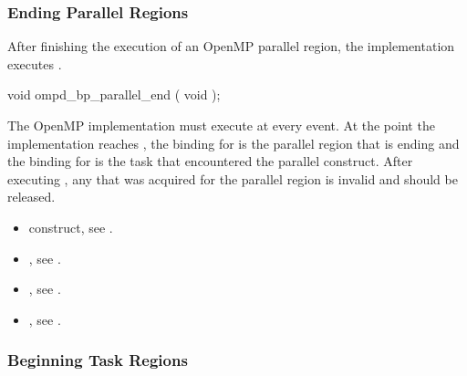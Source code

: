 \subsubsection{Ending Parallel Regions}
\label{subsubsec:ompd_bp_parallel_end}

\summary
After finishing the execution of an OpenMP parallel region, 
the implementation executes .

\format
\begin{cspecific}
\begin{ompSyntax}
void ompd_bp_parallel_end ( void );
\end{ompSyntax}
\end{cspecific}


\descr
The OpenMP implementation must execute  at 
every  event. At the point the implementation reaches 
, the binding for  
is the parallel region that is ending and the binding for 
 is the task that encountered the 
parallel construct. After executing , any 
 that was acquired for the parallel region is 
invalid and should be released.

\crossreferences
\begin{itemize}
\item {} construct, see .

\item {}, 
see .

\item {}, 
see .

\item {}, 
see .
\end{itemize}



\subsubsection{Beginning Task Regions}
\label{subsubsec:ompd_bp_task_begin}

\summary

